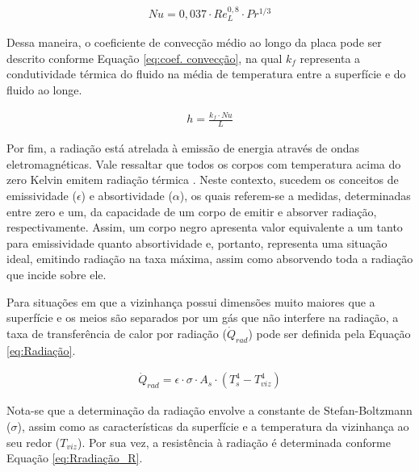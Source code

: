 \documentclass[acronym,symbols,table]{fei}
\begin{document}
\begin{equation} \label{eq:Nusselt_Turbulento}
\begin{aligned}
    Nu=0,037 \cdot Re_{L}^{0,8} \cdot Pr^{1/3}
\end{aligned}
\end{equation}

Dessa maneira, o coeficiente de convecção médio ao longo da placa pode ser descrito conforme Equação \ref{eq:coef. convecção}, na qual $k_{f}$ representa a condutividade térmica do fluido na média de temperatura entre a superfície e do fluido ao longe.

\begin{equation} \label{eq:coef. convecção}
\begin{aligned}
    h=\frac{k_{f} \cdot Nu}{L}
\end{aligned}
\end{equation}

Por fim, a radiação está atrelada à emissão de energia através de ondas eletromagnéticas. Vale ressaltar que todos os corpos com temperatura acima do zero Kelvin emitem radiação térmica \cite{kreith1999mechanical}. Neste contexto, sucedem os conceitos de emissividade ($\epsilon$) e absortividade ($\alpha$), os quais referem-se a medidas, determinadas entre zero e um, da capacidade de um corpo de emitir e absorver radiação, respectivamente. Assim, um corpo negro apresenta valor equivalente a um tanto para emissividade quanto absortividade e, portanto, representa uma situação ideal, emitindo radiação na taxa máxima, assim como absorvendo toda a radiação que incide sobre ele. 

Para situações em que a vizinhança possui dimensões muito maiores que a superfície e os meios são separados por um gás que não interfere na radiação, a taxa de transferência de calor por radiação ($\dot{Q}_{rad}$) pode ser definida pela Equação \ref{eq:Radiação}.

\begin{equation} \label{eq:Radiação}
\begin{aligned}
    \dot{Q}_{rad}=\epsilon \cdot \sigma \cdot A_{s} \cdot (T_{s}^4-T_{viz}^4)
\end{aligned}
\end{equation}

Nota-se que a determinação da radiação envolve a constante de Stefan-Boltzmann ($\sigma$), assim como as características da superfície e a temperatura da vizinhança ao seu redor ($T_{viz}$). Por sua vez, a resistência à radiação é determinada conforme Equação \ref{eq:Rradiação_R}.
\end{document}
